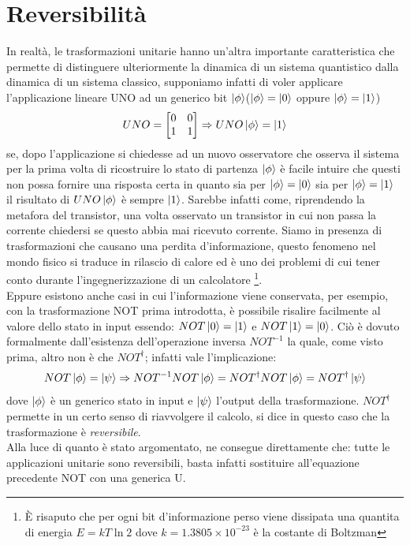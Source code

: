 \documentclass[12pt,a4paper,openright]{report}
\begin{document}
\section{Reversibilità}
In realtà, le trasformazioni unitarie hanno un'altra importante caratteristica che permette di distinguere ulteriormente la dinamica di un sistema quantistico
dalla dinamica di un sistema classico, supponiamo infatti di voler applicare l'applicazione lineare UNO ad un generico bit $\ket{\phi}$($\ket{\phi}=\ket0$ oppure $\ket{\phi}=\ket1$)
\[
UNO=
    \begin{bmatrix}
        0 & 0\\
        1 & 1 
    \end{bmatrix}
    \Rightarrow
    UNO\ket{\phi} = \ket1
\]
se, dopo l'applicazione si chiedesse ad un nuovo osservatore che osserva il sistema per la prima volta di ricostruire lo stato di partenza $\ket{\phi}$
è facile intuire che questi non possa fornire una risposta certa in quanto sia per $\ket{\phi}=\ket0$ sia per $\ket{\phi}=\ket1$ il risultato di $UNO\ket{\phi}$
è sempre $\ket{1}$. Sarebbe infatti come, riprendendo la metafora del transistor, una volta osservato un transistor in cui non passa la
corrente chiedersi se questo abbia mai ricevuto corrente. Siamo in presenza di trasformazioni che causano una perdita d'informazione,
questo fenomeno nel mondo fisico si traduce in rilascio di calore ed è uno dei problemi di cui tener conto durante l'ingegnerizzazione di un calcolatore \footnote{È risaputo che per ogni bit d'informazione perso viene dissipata una quantita di energia $E = kT\ln2$ dove $k=1.3805\times10^{-23}$ è la costante di Boltzman}. \\ 
Eppure esistono anche casi in cui l'informazione viene conservata, per esempio, con la trasformazione NOT prima introdotta, è possibile risalire facilmente al 
valore dello stato in input essendo: $NOT\ket0 = \ket1$ e $NOT\ket1 = \ket0$. Ciò è dovuto formalmente dall'esistenza dell'operazione inversa $NOT^{-1}$ la quale,
come visto prima, altro non è che $NOT^{\dag}$; infatti vale l'implicazione: \[NOT\ket{\phi}=\ket{\psi}\Rightarrow NOT^{-1}NOT\ket{\phi}= NOT^{\dag}NOT\ket{\phi}=NOT^{\dag}\ket{\psi}\] dove 
$\ket{\phi}$ è un generico stato in input e $\ket{\psi}$ l'output della trasformazione. $NOT^{\dag}$ permette in un certo senso di riavvolgere il calcolo, si dice in questo caso che
la trasformazione è \emph{reversibile}.\\
Alla luce di quanto è stato argomentato, ne consegue direttamente che: tutte le applicazioni unitarie sono reversibili, basta infatti sostituire all'equazione precedente NOT con una generica U. 
\end{document}
